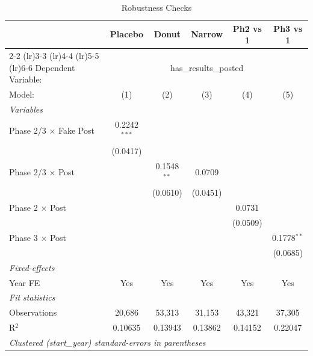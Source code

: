 
\begin{table}[htbp]
   \caption{\label{tab:robust} Robustness Checks}
   \centering
   \begin{tabular}{lccccc}
      \tabularnewline \midrule \midrule
       & Placebo & Donut & Narrow & Ph2 vs 1 & Ph3 vs 1 \\ \cmidrule(lr){2-2} \cmidrule(lr){3-3} \cmidrule(lr){4-4} \cmidrule(lr){5-5} \cmidrule(lr){6-6}
      Dependent Variable: & \multicolumn{5}{c}{has\_results\_posted}\\
      Model:                        & (1)            & (2)           & (3)      & (4)      & (5)\\  
      \midrule
      \emph{Variables}\\
      Phase 2/3 $\times$ Fake Post  & 0.2242$^{***}$ &               &          &          &   \\   
                                    & (0.0417)       &               &          &          &   \\   
      Phase 2/3 $\times$ Post       &                & 0.1548$^{**}$ & 0.0709   &          &   \\   
                                    &                & (0.0610)      & (0.0451) &          &   \\   
      Phase 2 $\times$ Post         &                &               &          & 0.0731   &   \\   
                                    &                &               &          & (0.0509) &   \\   
      Phase 3 $\times$ Post         &                &               &          &          & 0.1778$^{**}$\\   
                                    &                &               &          &          & (0.0685)\\   
      \midrule
      \emph{Fixed-effects}\\
      Year FE                       & Yes            & Yes           & Yes      & Yes      & Yes\\  
      \midrule
      \emph{Fit statistics}\\
      Observations                  & 20,686         & 53,313        & 31,153   & 43,321   & 37,305\\  
      R$^2$                         & 0.10635        & 0.13943       & 0.13862  & 0.14152  & 0.22047\\  
      \midrule \midrule
      \multicolumn{6}{l}{\emph{Clustered (start\_year) standard-errors in parentheses}}\\

\end{tabular}
\end{table}
